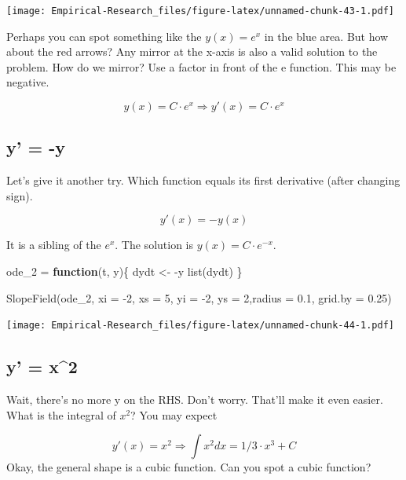 \documentclass[
]{book}
\newenvironment{Shaded}{\begin{snugshade}}{\end{snugshade}}
\newcommand{\AttributeTok}[1]{\textcolor[rgb]{0.77,0.63,0.00}{#1}}
\newcommand{\ControlFlowTok}[1]{\textcolor[rgb]{0.13,0.29,0.53}{\textbf{#1}}}
\newcommand{\DecValTok}[1]{\textcolor[rgb]{0.00,0.00,0.81}{#1}}
\newcommand{\FloatTok}[1]{\textcolor[rgb]{0.00,0.00,0.81}{#1}}
\newcommand{\FunctionTok}[1]{\textcolor[rgb]{0.00,0.00,0.00}{#1}}
\newcommand{\NormalTok}[1]{#1}
\newcommand{\OtherTok}[1]{\textcolor[rgb]{0.56,0.35,0.01}{#1}}
\newcommand{\SpecialCharTok}[1]{\textcolor[rgb]{0.00,0.00,0.00}{#1}}
\begin{document}
\texttt{[image: Empirical-Research\_files/figure-latex/unnamed-chunk-43-1.pdf]}

Perhaps you can spot something like the \(y(x) = e^x\) in the blue area. But how about the red arrows? Any mirror at the x-axis is also a valid solution to the problem. How do we mirror? Use a factor in front of the e function. This may be negative.

\[y(x) = C \cdot e^x \Rightarrow y'(x) = C \cdot e^x \]

\hypertarget{y--y}{%
\subsection{y' = -y}\label{y--y}}

Let's give it another try. Which function equals its first derivative (after changing sign).

\[y'(x) = -y(x)\]

It is a sibling of the \(e^x\). The solution is \(y(x) = C \cdot e^{-x}\).

\begin{Shaded}
\begin{Highlighting}[]
\NormalTok{ode\_2 }\OtherTok{=} \ControlFlowTok{function}\NormalTok{(t, y)\{}
\NormalTok{  dydt }\OtherTok{\textless{}{-}} \SpecialCharTok{{-}}\NormalTok{y}
  \FunctionTok{list}\NormalTok{(dydt)}
\NormalTok{\}}

\FunctionTok{SlopeField}\NormalTok{(ode\_2, }\AttributeTok{xi =} \SpecialCharTok{{-}}\DecValTok{2}\NormalTok{, }\AttributeTok{xs =} \DecValTok{5}\NormalTok{, }\AttributeTok{yi =} \SpecialCharTok{{-}}\DecValTok{2}\NormalTok{, }\AttributeTok{ys =} \DecValTok{2}\NormalTok{,}\AttributeTok{radius =} \FloatTok{0.1}\NormalTok{, }\AttributeTok{grid.by =} \FloatTok{0.25}\NormalTok{)}
\end{Highlighting}
\end{Shaded}

\texttt{[image: Empirical-Research\_files/figure-latex/unnamed-chunk-44-1.pdf]}

\hypertarget{y-x2}{%
\subsection{y' = x\^{}2}\label{y-x2}}

Wait, there's no more y on the RHS. Don't worry. That'll make it even easier. What is the integral of \(x^2\)? You may expect

\[y'(x) = x^2 \Rightarrow \int x^2 dx = 1/3 \cdot x^3 + C\]
Okay, the general shape is a cubic function. Can you spot a cubic function?
\end{document}
